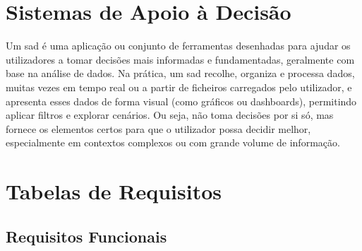 



\chapter{Sistemas de Apoio à Decisão}
\label{ch:sad}

Um \gls{sad} é uma aplicação ou conjunto de ferramentas desenhadas para ajudar os utilizadores a tomar decisões mais informadas e fundamentadas, geralmente com base na análise de dados. Na prática, um \gls{sad} recolhe, organiza e processa dados, muitas vezes em tempo real ou a partir de ficheiros carregados pelo utilizador, e apresenta esses dados de forma visual (como gráficos ou dashboards), permitindo aplicar filtros e explorar cenários. Ou seja, não toma decisões por si só, mas fornece os elementos certos para que o utilizador possa decidir melhor, especialmente em contextos complexos ou com grande volume de informação.

\chapter{Tabelas de Requisitos}
\label{ch:tabRequisitos}

\section{Requisitos Funcionais}

